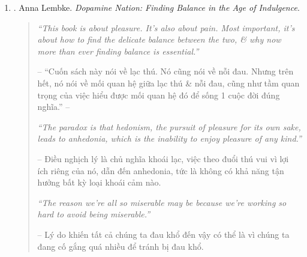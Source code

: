 \documentclass{article}
\begin{document}
\begin{enumerate}
	{\sf Editorial reviews.}
	\begin{itemize}
		\item ``Whether religious or not, this book will speak because it touches -- profoundly, but simply -- on questions no parent \& no person can avoid.'' -- {\sc Harvey Cox}, Harvard Divinity School
		\item ``{\it When Bad Things Happen to Good People} offers a moving \& humane approach to understanding life's windstorms.'' -- {\sc Elisabeth KŸbler-Ross}
		\item ``A touching, heartwarming book for those of us who must content with suffering, \& that, of course, is all of us.'' -- {\sc Andrew M. Greeley}
		\item ``This is a book all humanity needs. It will help you understand the painful vicissitudes of this life \& enable you to stand up to them creatively.'' -- {\sc Norman Vincent Peale}
	\end{itemize}
	{\sf About the Author.} {\sc Harold S. Kushner} is rabbi laureate of Temple Israel in Natick, Massachusetts, having long served that congregation. He is best known as the author of {\it When Bad Things Happen to Good People}.
		
	\item \cite{Lembke_dopamine}. {\sc Anna Lembke}. {\it Dopamine Nation: Finding Balance in the Age of Indulgence}.\hfill{\sf[reading]}
	\begin{quotation}
		{\it``This book is about pleasure. It's also about pain. Most important, it's about how to find the delicate balance between the two, \& why now more than ever finding balance is essential.''}
		
		-- ``Cuốn sách này nói về lạc thú. Nó cũng nói về nỗi đau. Nhưng trên hết, nó nói về mối quan hệ giữa lạc thú \& nỗi đau, cũng như tầm quan trọng của việc hiểu được mối quan hệ đó để sống 1 cuộc đời đúng nghĩa.'' -- \cite[p. 9]{Lembke_dopamine_VN}
		
		{\it``The paradox is that hedonism, the pursuit of pleasure for its own sake, leads to anhedonia, which is the inability to enjoy pleasure of any kind.''}
		
		-- Điều nghịch lý là chủ nghĩa khoái lạc, việc theo đuổi thú vui vì lợi ích riêng của nó, dẫn đến anhedonia, tức là không có khả năng tận hưởng bất kỳ loại khoái cảm nào.
		
		{\it``The reason we're all so miserable may be because we're working so hard to avoid being miserable.''}
		
		-- Lý do khiến tất cả chúng ta đau khổ đến vậy có thể là vì chúng ta đang cố gắng quá nhiều để tránh bị đau khổ.
		

\end{quotation}
\end{enumerate}
\end{document}
